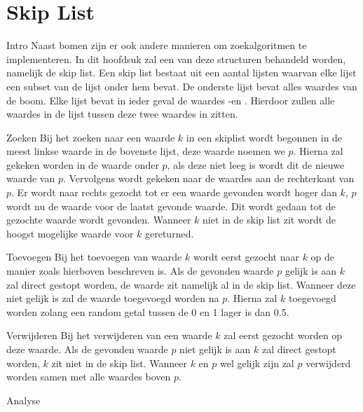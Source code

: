 \chapter{Skip List}
\label{sec:Hoofdstuk 6}

Intro
Naast bomen zijn er ook andere manieren om zoekalgoritmen te implementeren. In dit hoofdsuk zal een van deze structuren behandeld worden, namelijk de skip list. Een skip list bestaat uit een aantal lijsten waarvan elke lijst een subset van de lijst onder hem bevat. De onderste lijst bevat alles waardes van de boom. Elke lijst bevat in ieder geval de waardes -\infty en \infty. Hierdoor zullen alle waardes in de lijst tussen deze twee waardes in zitten.

Zoeken
Bij het zoeken naar een waarde $k$ in een skiplist wordt begonnen in de meest linkse waarde in de bovenste lijst, deze waarde noemen we $p$. Hierna zal gekeken worden in de waarde onder $p$, als deze niet leeg is wordt dit de nieuwe waarde van $p$. Vervolgens wordt gekeken naar de waardes aan de rechterkant van $p$. Er wordt naar rechts gezocht tot er een waarde gevonden wordt hoger dan $k$, $p$ wordt nu de waarde voor de laatst gevonde waarde. Dit wordt gedaan tot de gezochte waarde wordt gevonden. Wanneer $k$ niet in de skip list zit wordt de hoogst mogelijke waarde voor $k$ gereturned.

Toevoegen
Bij het toevoegen van waarde $k$ wordt eerst gezocht naar $k$ op de manier zoals hierboven beschreven is. Als de gevonden waarde $p$ gelijk is aan $k$ zal direct gestopt worden, de waarde zit namelijk al in de skip list. Wanneer deze niet gelijk is zal de waarde toegevoegd worden na $p$. Hierna zal $k$ toegevoegd worden zolang een random getal tussen de 0 en 1 lager is dan 0.5.

Verwijderen
Bij het verwijderen van een waarde $k$ zal eerst gezocht worden op deze waarde. Als de gevonden waarde $p$ niet gelijk is aan $k$ zal direct gestopt worden, $k$ zit niet in de skip list. Wanneer $k$ en $p$ wel gelijk zijn zal $p$ verwijderd worden samen met alle waardes boven $p$.

Analyse


